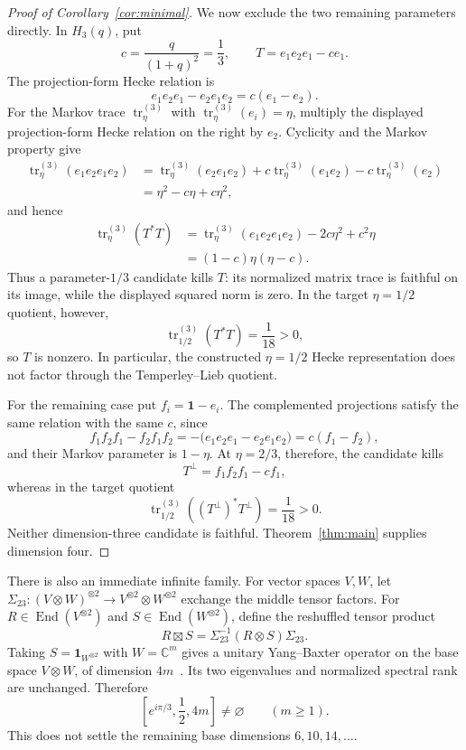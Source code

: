 \documentclass[11pt]{article}
\theoremstyle{remark}
\newcommand{\Id}{\mathbf 1}
\newcommand{\End}{\operatorname{End}}
\newcommand{\bbC}{\mathbb C}
\newcommand{\boxt}{\mathbin{\boxtimes}}
\begin{document}
\begin{proof}[Proof of Corollary~\ref{cor:minimal}]
We now exclude the two remaining parameters directly.  In \(H_3(q)\), put
\[
  c=\frac{q}{(1+q)^2}=\frac13,
  \qquad T=e_1e_2e_1-ce_1.
\]
The projection-form Hecke relation is
\[
  e_1e_2e_1-e_2e_1e_2=c(e_1-e_2).
\]
For the Markov trace \(\operatorname{tr}^{(3)}_\eta\) with
\(\operatorname{tr}^{(3)}_\eta(e_i)=\eta\), multiply the displayed
projection-form Hecke relation on the right by \(e_2\).  Cyclicity and the
Markov property give
\[
\begin{aligned}
  \operatorname{tr}^{(3)}_\eta(e_1e_2e_1e_2)
  &=\operatorname{tr}^{(3)}_\eta(e_2e_1e_2)
    +c\operatorname{tr}^{(3)}_\eta(e_1e_2)
    -c\operatorname{tr}^{(3)}_\eta(e_2)\\
  &=\eta^2-c\eta+c\eta^2,
\end{aligned}
\]
and hence
\[
\begin{aligned}
  \operatorname{tr}^{(3)}_\eta(T^*T)
  &=\operatorname{tr}^{(3)}_\eta(e_1e_2e_1e_2)
    -2c\eta^2+c^2\eta\\
  &=(1-c)\eta(\eta-c).
\end{aligned}
\]
Thus a parameter-\(1/3\) candidate kills \(T\): its normalized matrix trace
is faithful on its image, while the displayed squared norm is zero.  In the
target \(\eta=1/2\) quotient, however,
\[
  \operatorname{tr}^{(3)}_{1/2}(T^*T)=\frac1{18}>0,
\]
so \(T\) is nonzero.  In particular, the constructed \(\eta=1/2\) Hecke
representation does not factor through the Temperley--Lieb quotient.

For the remaining case put \(f_i=\Id-e_i\).  The complemented projections
satisfy the same relation with the same \(c\), since
\[
  f_1f_2f_1-f_2f_1f_2
  =-\bigl(e_1e_2e_1-e_2e_1e_2\bigr)=c(f_1-f_2),
\]
and their Markov parameter is \(1-\eta\).  At \(\eta=2/3\), therefore, the
candidate kills
\[
  T^\perp=f_1f_2f_1-cf_1,
\]
whereas in the target quotient
\[
  \operatorname{tr}^{(3)}_{1/2}\!\left((T^\perp)^*T^\perp\right)
  =\frac1{18}>0.
\]
Neither dimension-three candidate is faithful.  Theorem~\ref{thm:main}
supplies dimension four.
\end{proof}

There is also an immediate infinite family.  For vector spaces \(V,W\), let
\(\Sigma_{23}:(V\otimes W)^{\otimes2}\to V^{\otimes2}\otimes W^{\otimes2}\)
exchange the middle tensor factors.  For
\(R\in\End(V^{\otimes2})\) and \(S\in\End(W^{\otimes2})\), define the
reshuffled tensor product
\[
  R\boxt S=\Sigma_{23}^{-1}(R\otimes S)\Sigma_{23}.
\]
Taking \(S=\Id_{W^{\otimes2}}\) with \(W=\bbC^m\) gives a unitary
Yang--Baxter operator on the base space \(V\otimes W\), of dimension
\(4m\)~\cite[\S3]{Lechner2026}.  Its two eigenvalues and normalized spectral
rank are unchanged.  Therefore
\begin{equation}
  \left[e^{i\pi/3},\frac12,4m\right]\ne\varnothing
  \qquad(m\ge1).
  \label{eq:amplification}
\end{equation}
This does not settle the remaining base dimensions
\(6,10,14,\ldots\).
\end{document}
